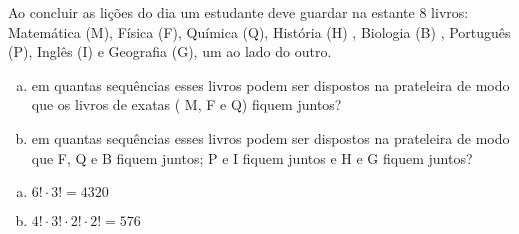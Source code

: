\begin{ex}
Ao concluir as lições do dia um estudante deve guardar na estante 8 livros: Matemática (M), Física (F), Química (Q), História (H) , Biologia (B) , Português (P), Inglês (I) e Geografia (G), um ao lado do outro.
   \begin{enumerate}[(a)]
   \item em quantas sequências esses livros podem ser dispostos na prateleira de modo que os livros de exatas ( M, F e Q) fiquem juntos?
   \item em quantas sequências esses livros podem ser dispostos na prateleira de modo que F, Q e B fiquem juntos; P e I fiquem juntos e H e G fiquem juntos?
   \end{enumerate}
     \begin{sol}
       \phantom{A} 
        \begin{enumerate} [(a)]
            \item $6!\cdot3!=4320$
            \item $4!\cdot3!\cdot2!\cdot2!=576$
        \end{enumerate}
     \end{sol}
\end{ex}